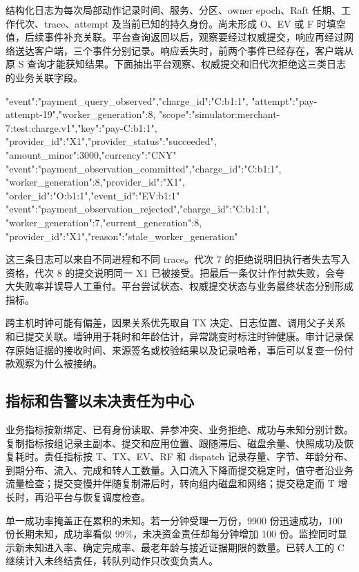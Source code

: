 结构化日志为每次局部动作记录时间、服务、分区、owner epoch、Raft 任期、工作代次、trace、attempt 及当前已知的持久身份。尚未形成 O、EV 或 F 时填空值，后续事件补充关联。平台查询返回以后，观察要经过权威提交，响应再经过网络送达客户端，三个事件分别记录。响应丢失时，前两个事件已经存在，客户端从原 S 查询才能获知结果。下面抽出平台观察、权威提交和旧代次拒绝这三类日志的业务关联字段。

\begin{BookCode}
{"event":"payment_query_observed","charge_id":"C:b1:1",
 "attempt":"pay-attempt-19","worker_generation":8,
 "scope":"simulator:merchant-7:test:charge.v1","key":"pay-C:b1:1",
 "provider_id":"X1","provider_status":"succeeded",
 "amount_minor":3000,"currency":"CNY"}
{"event":"payment_observation_committed","charge_id":"C:b1:1",
 "worker_generation":8,"provider_id":"X1",
 "order_id":"O:b1:1","event_id":"EV:b1:1"}
{"event":"payment_observation_rejected","charge_id":"C:b1:1",
 "worker_generation":7,"current_generation":8,
 "provider_id":"X1","reason":"stale_worker_generation"}
\end{BookCode}

这三条日志可以来自不同进程和不同 trace。代次 7 的拒绝说明旧执行者失去写入资格，代次 8 的提交说明同一 X1 已被接受。把最后一条仅计作付款失败，会夸大失败率并误导人工重付。平台尝试状态、权威提交状态与业务最终状态分别形成指标。

跨主机时钟可能有偏差，因果关系优先取自 TX 决定、日志位置、调用父子关系和已提交关联。墙钟用于耗时和年龄估计，异常跳变时标注时钟健康。审计记录保存原始证据的接收时间、来源签名或校验结果以及记录哈希，事后可以复查一份付款观察为什么被接纳。

\subsection{指标和告警以未决责任为中心}

业务指标按新绑定、已有身份读取、异参冲突、业务拒绝、成功与未知分别计数。复制指标按组记录主副本、提交和应用位置、跟随滞后、磁盘余量、快照成功及恢复耗时。责任指标按 T、TX、EV、RF 和 dispatch 记录存量、字节、年龄分布、到期分布、流入、完成和转人工数量。入口流入下降而提交稳定时，值守者沿业务流量检查；提交变慢并伴随复制滞后时，转向组内磁盘和网络；提交稳定而 T 增长时，再沿平台与恢复调度检查。

单一成功率掩盖正在累积的未知。若一分钟受理一万份，9900 份迅速成功，100 份长期未知，成功率看似 99\%，未决资金责任却每分钟增加 100 份。监控同时显示新未知进入率、确定完成率、最老年龄与接近证据期限的数量。已转人工的 C 继续计入未终结责任，转队列动作只改变负责人。

